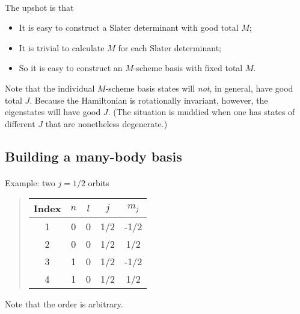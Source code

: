 \paragraph{}

The upshot is that 
\begin{itemize}
\item It is easy to construct a Slater determinant with good total $M$;

\item It is trivial to calculate $M$ for each Slater determinant;

\item So it is easy to construct an $M$-scheme basis with fixed total $M$.
\end{itemize}

\noindent
Note that the individual $M$-scheme basis states will \emph{not}, in general, 
have good total $J$. 
Because the Hamiltonian is rotationally invariant, however, the eigenstates will 
have good $J$. (The situation is muddied when one has states of different $J$ that are 
nonetheless degenerate.)



\subsection*{Building a many-body basis}

\paragraph{}
Example: two $j=1/2$ orbits


\begin{quote}
\begin{tabular}{ccccc}
\hline
\multicolumn{1}{c}{ Index } & \multicolumn{1}{c}{ $n$ } & \multicolumn{1}{c}{ $l$ } & \multicolumn{1}{c}{ $j$ } & \multicolumn{1}{c}{ $m_j$ } \\
\hline
1     & 0   & 0   & 1/2 & -1/2  \\
2     & 0   & 0   & 1/2 & 1/2   \\
3     & 1   & 0   & 1/2 & -1/2  \\
4     & 1   & 0   & 1/2 & 1/2   \\
\hline
\end{tabular}
\end{quote}

\noindent
Note that the order is arbitrary.



